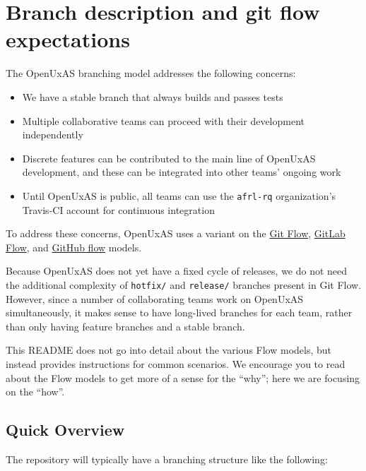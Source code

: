 \section{Branch description and git flow
expectations}\label{branch-description-and-git-flow-expectations}

The OpenUxAS branching model addresses the following concerns:

\begin{itemize}
\item
  We have a stable branch that always builds and passes tests
\item
  Multiple collaborative teams can proceed with their development
  independently
\item
  Discrete features can be contributed to the main line of OpenUxAS
  development, and these can be integrated into other teams' ongoing
  work
\item
  Until OpenUxAS is public, all teams can use the \texttt{afrl-rq}
  organization's Travis-CI account for continuous integration
\end{itemize}

To address these concerns, OpenUxAS uses a variant on the
\href{http://nvie.com/posts/a-successful-git-branching-model/}{Git
Flow},
\href{https://docs.gitlab.com/ee/workflow/gitlab_flow.html}{GitLab
Flow}, and \href{https://guides.github.com/introduction/flow/}{GitHub
flow} models.

Because OpenUxAS does not yet have a fixed cycle of releases, we do not
need the additional complexity of \texttt{hotfix/} and \texttt{release/}
branches present in Git Flow. However, since a number of collaborating
teams work on OpenUxAS simultaneously, it makes sense to have long-lived
branches for each team, rather than only having feature branches and a
stable branch.

This README does not go into detail about the various Flow models, but
instead provides instructions for common scenarios. We encourage you to
read about the Flow models to get more of a sense for the ``why''; here
we are focusing on the ``how''.

\subsection{Quick Overview}\label{quick-overview}

The repository will typically have a branching structure like the
following:

